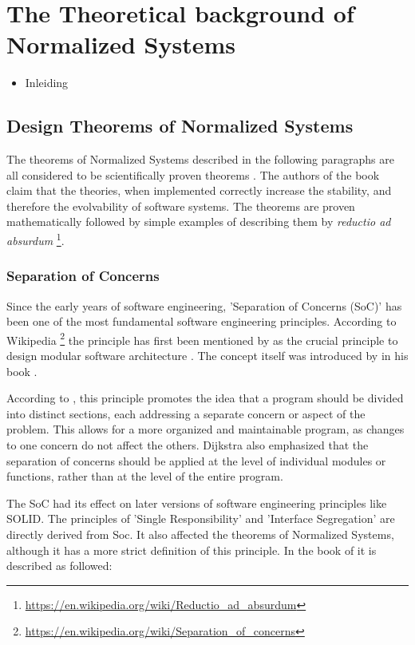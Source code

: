 \section{The Theoretical background of Normalized Systems} 
\label{ns_theory}
\begin{itemize}
    \item Inleiding
\end{itemize}


\subsection{Design Theorems of Normalized Systems} \label{subsec:ns_desing_theorems}

The theorems of Normalized Systems described in the following paragraphs are all
considered to be scientifically proven theorems \parencite{mannaert_normalized_2016}. The
authors of the book claim that the theories, when implemented correctly increase
the stability, and therefore the evolvability of software systems. The theorems are proven
mathematically followed by simple examples of describing them by \textit{reductio ad absurdum} 
\footnote{\url{https://en.wikipedia.org/wiki/Reductio_ad_absurdum}}.

\subsubsection{Separation of Concerns}
Since the early years of software engineering, 'Separation of Concerns (SoC)' has been one
of the most fundamental software engineering principles. According to Wikipedia
\footnote{\url{https://en.wikipedia.org/wiki/Separation_of_concerns}} the principle has
first been mentioned by \citeauthor{dijkstra_selected_1982} as the crucial principle to
design modular software architecture \parencite[]{dijkstra_selected_1982}. The concept
itself was introduced by \citeauthor{broy_criteria_1972} in his book
.

According to \citeauthor{dijkstra_selected_1982}, this principle promotes the idea that a
program should be divided into distinct sections, each addressing a separate concern or
aspect of the problem. This allows for a more organized and maintainable program, as
changes to one concern do not affect the others. Dijkstra also emphasized that the
separation of concerns should be applied at the level of individual modules or functions,
rather than at the level of the entire program.

The SoC had its effect on later versions of software engineering principles like SOLID.
The principles of 'Single Responsibility' and 'Interface Segregation' are directly derived
from Soc. It also affected the theorems of Normalized Systems, although it has a more
strict definition of this principle. In the book of \citeauthor{mannaert_normalized_2016}
it is described as followed: 

